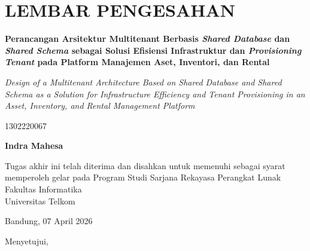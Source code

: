 \chapter*{LEMBAR PENGESAHAN}

\begin{singlespacing}

\begin{center}
  {\large\bfseries
    Perancangan Arsitektur Multitenant Berbasis \textit{Shared Database} dan \textit{Shared Schema}
    sebagai Solusi Efisiensi Infrastruktur dan \textit{Provisioning Tenant}
    pada Platform Manajemen Aset, Inventori, dan Rental
  \par}

  \vspace{0.3cm}

  {\normalsize\itshape
    Design of a Multitenant Architecture Based on Shared Database and Shared Schema
    as a Solution for Infrastructure Efficiency and Tenant Provisioning
    in an Asset, Inventory, and Rental Management Platform
  \par}
\end{center}

\vspace{0.3cm}

\begin{center}
  {\normalsize 1302220067\par}
  {\large\bfseries Indra Mahesa\par}
\end{center}

\vspace{0.3cm}

\begin{center}
  Tugas akhir ini telah diterima dan disahkan untuk memenuhi sebagai syarat memperoleh
  gelar pada Program Studi Sarjana Rekayasa Perangkat Lunak\\
  Fakultas Informatika\\
  \vspace{0.2cm}
  Universitas Telkom
\end{center}

\vspace{0.3cm}

\begin{center}
  Bandung, 07 April 2026
\end{center}

\vspace{0.2cm}
\begin{center}
  Menyetujui,
\end{center}


\end{singlespacing}

